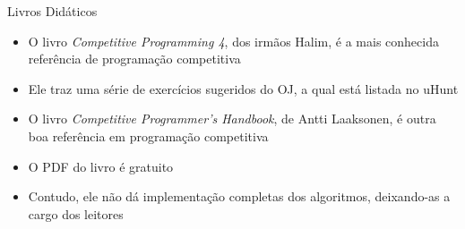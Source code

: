 \begin{frame}[fragile]{Livros Didáticos}

    \begin{itemize}
        \item O livro \textit{Competitive Programming 4}, dos irmãos Halim, é a mais conhecida
            referência de programação competitiva

        \item Ele traz uma série de exercícios sugeridos do OJ, a qual está listada no uHunt

        \item O livro \textit{Competitive Programmer's Handbook}, de Antti Laaksonen, é outra
            boa referência em programação competitiva

        \item O PDF do livro é gratuito

        \item Contudo, ele não dá implementação completas dos algoritmos, deixando-as a cargo
            dos leitores
    \end{itemize}

\end{frame}
